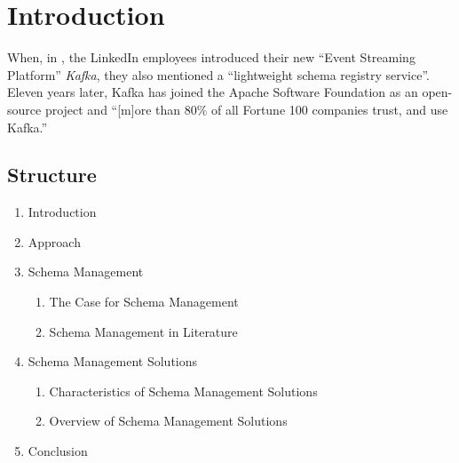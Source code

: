 
\section{Introduction}\label{sec:introduction}

When, in \citeyear{kreps_kafka_2011}, the LinkedIn employees \citeauthor{kreps_kafka_2011} introduced their new \enquote{Event Streaming Platform} \emph{Kafka}, they also mentioned a \enquote{lightweight schema registry service}.
Eleven years later, Kafka has joined the Apache Software Foundation as an open-source project and \enquote{[m]ore than 80\% of all Fortune 100 companies trust, and use Kafka.} \parencite{noauthor_apache_nodate}

\subsection{Structure}

\begin{enumerate}
  \item Introduction
  \item Approach
  \item Schema Management
        \begin{enumerate}
          \item The Case for Schema Management
          \item Schema Management in Literature
        \end{enumerate}
  \item Schema Management Solutions
        \begin{enumerate}
          \item Characteristics of Schema Management Solutions
          \item Overview of Schema Management Solutions
        \end{enumerate}
  \item Conclusion
\end{enumerate}
